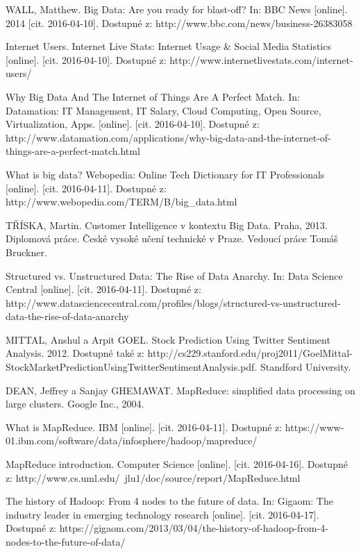 \documentclass[thesis=B,czech]{FITthesis}[2012/06/26]
\begin{document}
\begin{thebibliography}{1}

 WALL, Matthew. Big Data: Are you ready for blast-off? In: BBC News [online]. 2014 [cit. 2016-04-10]. Dostupné z: http://www.bbc.com/news/business-26383058

 Internet Users. Internet Live Stats: Internet Usage \& Social Media Statistics [online]. [cit. 2016-04-10]. Dostupné z: http://www.internetlivestats.com/internet-users/

 Why Big Data And The Internet of Things Are A Perfect Match. In: Datamation: IT Management, IT Salary, Cloud Computing, Open Source, Virtualization, Apps. [online]. [cit. 2016-04-10]. Dostupné z: http://www.datamation.com/applications/why-big-data-and-the-internet-of-things-are-a-perfect-match.html

 What is big data? Webopedia: Online Tech Dictionary for IT Professionals [online]. [cit. 2016-04-11]. Dostupné z: http://www.webopedia.com/TERM/B/big\_data.html

 TŘÍSKA, Martin. Customer Intelligence v kontextu Big Data. Praha, 2013. Diplomová práce. České vysoké učení technické v Praze. Vedoucí práce Tomáš Bruckner.

Structured vs. Unstructured Data: The Rise of Data Anarchy. In: Data Science Central [online]. [cit. 2016-04-11]. Dostupné z: http://www.datasciencecentral.com/profiles/blogs/structured-vs-unstructured-data-the-rise-of-data-anarchy

MITTAL, Anshul a Arpit GOEL. Stock Prediction Using Twitter Sentiment Analysis. 2012. Dostupné také z: http://cs229.stanford.edu/proj2011/GoelMittal-StockMarketPredictionUsingTwitterSentimentAnalysis.pdf. Standford University.

DEAN, Jeffrey a Sanjay GHEMAWAT. MapReduce: simplified data processing on large clusters. Google Inc., 2004.

What is MapReduce. IBM [online]. [cit. 2016-04-11]. Dostupné z: https://www-01.ibm.com/software/data/infosphere/hadoop/mapreduce/

MapReduce introduction. Computer Science [online]. [cit. 2016-04-16]. Dostupné z: http://www.cs.uml.edu/~jlu1/doc/source/report/MapReduce.html

The history of Hadoop: From 4 nodes to the future of data. In: Gigaom: The industry leader in emerging technology research [online]. [cit. 2016-04-17]. Dostupné z: https://gigaom.com/2013/03/04/the-history-of-hadoop-from-4-nodes-to-the-future-of-data/


\end{thebibliography}
\end{document}
